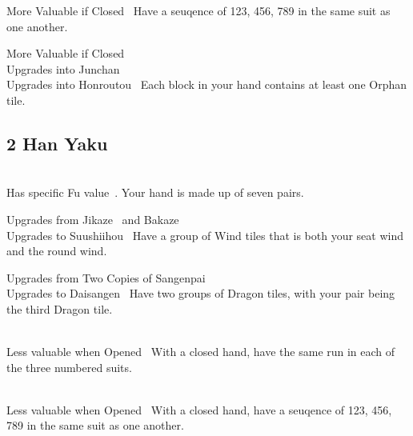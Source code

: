 	{\morevaluable More Valuable if Closed~}
	{Have a seuqence of 123, 456, 789 in the same suit as one another.}

	{\morevaluable More Valuable if Closed~\\
	\upgradesto Upgrades into Junchan~\\
	\upgradesto Upgrades into Honroutou~}
	{Each block in your hand contains at least one Orphan tile.}


\subsection{2 Han Yaku}\label{core:ssec:2-han-yaku}

	{\closedhand \\
	\upgradestoother Has specific Fu value~.}
	{Your hand is made up of seven pairs.}

	{\upgradesfrom Upgrades from Jikaze~ and Bakaze~\\
	\upgradesto Upgrades to Suushiihou~}
	{Have a group of Wind tiles that is both your seat wind and the round wind.}

	{\upgradesfrom Upgrades from Two Copies of Sangenpai~\\ 
	\upgradesto Upgrades to Daisangen~}
	{Have two groups of Dragon tiles, with your pair being the third Dragon tile.}

	{\closedhand \\ 
	\lessvaluable Less valuable when Opened~}
	{With a closed hand, have the same run in each of the three numbered suits.}

	{\closedhand \\
	\lessvaluable Less valuable when Opened~}
	{With a closed hand, have a seuqence of 123, 456, 789 in the same suit as one another.}

